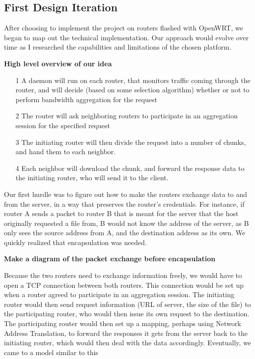 \documentclass[12pt]{article}
\newcommand{\comment}[1]
{{\bfseries \color{blue} #1}}
\begin{document}
	\subsection{First Design Iteration}
		
		After choosing to implement the project on routers flashed with OpenWRT, we began to map out the technical implementation. Our approach would evolve over time as I researched the capabilities and limitations of the chosen platform. 

		{\bf High level overview of our idea}
		\begin{itemize}
			\item[1] A daemon will run on each router, that monitors traffic coming through the router, and will decide (based on some selection algorithm) whether or not to perform bandwidth aggregation for the request
			\item[2] The router will ask neighboring routers to participate in an aggregation session for the specified request
			\item[3] The initiating router will then divide the request into a number of chunks, and hand them to each neighbor.
			\item[4] Each neighbor will download the chunk, and forward the response data to the initiating router, who will send it to the client.
		\end{itemize}

		Our first hurdle was to figure out how to make the routers exchange data to and from the server, in a way that preserves the router's credentials. For instance, if router A sends a packet to router B that is meant for the server that the host originally requested a file from, B would not know the address of the server, as B only sees the source address from A, and the destination address as its own. We quickly realized that encapsulation was needed. 

		\comment{Make a diagram of the packet exchange before encapsulation}

		Because the two routers need to exchange information freely, we would have to open a TCP connection between both routers. This connection would be set up when a router agreed to participate in an aggregation session. The initiating router would then send request information (URL of server, the size of the file) to the participating router, who would then issue its own request to the destination. The participating router would then set up a mapping, perhaps using Network Address Translation, to forward the responses it gets from the server back to the initiating router, which would then deal with the data accordingly. Eventually, we came to a model similar to this
\end{document}
